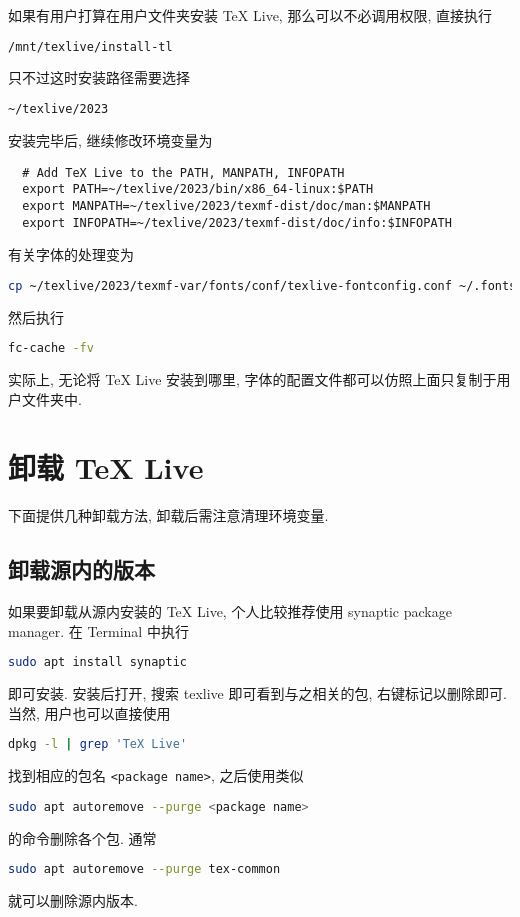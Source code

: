 如果有用户打算在用户文件夹安装 \TeX{} Live,
那么可以不必调用权限,
直接执行
\begin{lstlisting}[language=bash]
  /mnt/texlive/install-tl
\end{lstlisting}
只不过这时安装路径需要选择
\begin{lstlisting}[language=bash]
  ~/texlive/2023
\end{lstlisting}
安装完毕后,
继续修改环境变量为
\begin{lstlisting}
  # Add TeX Live to the PATH, MANPATH, INFOPATH
  export PATH=~/texlive/2023/bin/x86_64-linux:$PATH
  export MANPATH=~/texlive/2023/texmf-dist/doc/man:$MANPATH
  export INFOPATH=~/texlive/2023/texmf-dist/doc/info:$INFOPATH
\end{lstlisting}
有关字体的处理变为
\begin{lstlisting}[language=bash]
  cp ~/texlive/2023/texmf-var/fonts/conf/texlive-fontconfig.conf ~/.fonts.conf/09-texlive.conf
\end{lstlisting}
然后执行
\begin{lstlisting}[language=bash]
  fc-cache -fv
\end{lstlisting}
实际上,
无论将 \TeX{} Live 安装到哪里,
字体的配置文件都可以仿照上面只复制于用户文件夹中.

\section{卸载 \TeX{} Live}\label{sec:ubuntu:uninstall}

下面提供几种卸载方法,
卸载后需注意清理环境变量.

\subsection{卸载源内的版本}\label{sec:ubuntu:aptremove}

如果要卸载从源内安装的 \TeX{} Live, 个人比较推荐使用 synaptic package manager.
在 \textsf{Terminal} 中执行
\begin{lstlisting}[language = bash]
  sudo apt install synaptic
\end{lstlisting}
即可安装.
安装后打开, 搜索 \textsf{texlive} 即可看到与之相关的包, 右键标记以删除即可.
当然, 用户也可以直接使用
\begin{lstlisting}[language = bash]
  dpkg -l | grep 'TeX Live'
\end{lstlisting}
找到相应的包名 \texttt{<package name>}, 之后使用类似
\begin{lstlisting}[language = bash]
  sudo apt autoremove --purge <package name>
\end{lstlisting}
的命令删除各个包.
通常
\begin{lstlisting}[language = bash]
  sudo apt autoremove --purge tex-common
\end{lstlisting}
就可以删除源内版本.

